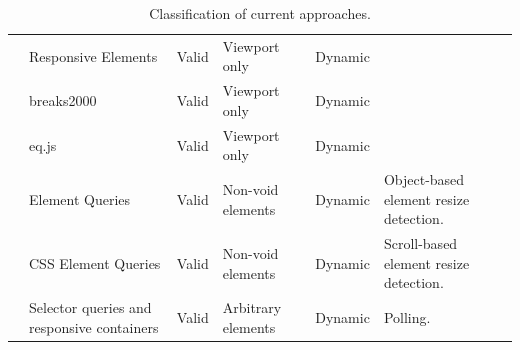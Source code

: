 \documentclass[a4paper,11pt]{kth-mag}
\begin{document}
\begin{table}[ht]
\begin{tabular}[t]{ l p{3cm} l l l p{3cm} }
        \cite{eq_imp_responsive-elements-2} & Responsive Elements &                         Valid &     Viewport only &       Dynamic &   \\ 
        \cite{eq_imp_breaks2000} &            breaks2000 &                                  Valid &     Viewport only &       Dynamic &   \\
        \cite{eq_imp_eqjs} &                  eq.js &                                       Valid &     Viewport only &       Dynamic &   \\
        \cite{eq_imp_element-queries} &       Element Queries &                             Valid &     Non-void elements &   Dynamic &   Object-based element resize detection. \\
        \cite{eq_imp_css-element-queries} &   CSS Element Queries &                         Valid &     Non-void elements &   Dynamic &   Scroll-based element resize detection. \\
        \cite{eq_imp_selector_queries} &      Selector queries and responsive containers &  Valid &     Arbitrary elements &  Dynamic &   Polling. \\
      \end{tabular}
      \caption{Classification of current approaches.}
      \label{table:approaches-classifications}
    \end{table}
\end{document}
